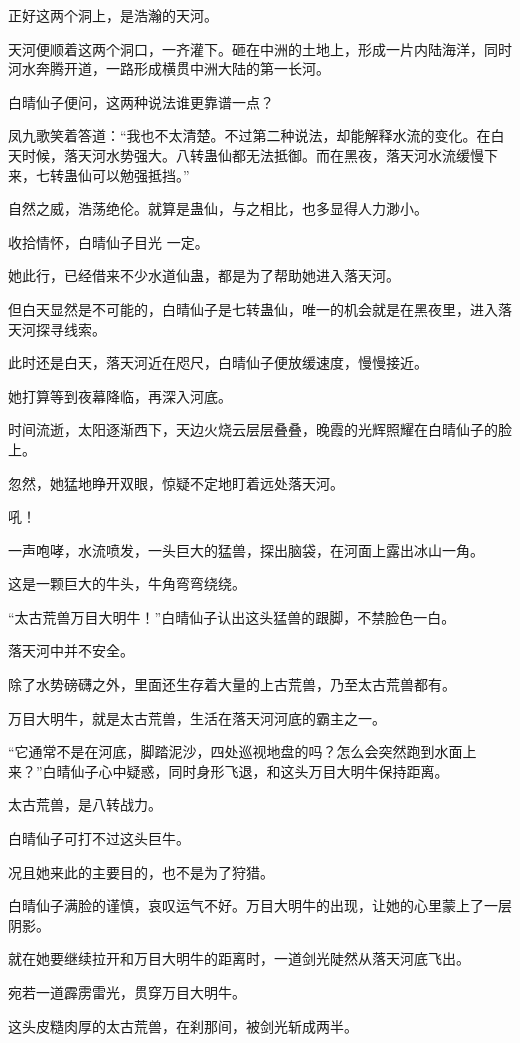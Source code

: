 \begin{this_body}
正好这两个洞上，是浩瀚的天河。

天河便顺着这两个洞口，一齐灌下。砸在中洲的土地上，形成一片内陆海洋，同时河水奔腾开道，一路形成横贯中洲大陆的第一长河。

白晴仙子便问，这两种说法谁更靠谱一点？

凤九歌笑着答道：“我也不太清楚。不过第二种说法，却能解释水流的变化。在白天时候，落天河水势强大。八转蛊仙都无法抵御。而在黑夜，落天河水流缓慢下来，七转蛊仙可以勉强抵挡。”

自然之威，浩荡绝伦。就算是蛊仙，与之相比，也多显得人力渺小。

收拾情怀，白晴仙子目光 一定。

她此行，已经借来不少水道仙蛊，都是为了帮助她进入落天河。

但白天显然是不可能的，白晴仙子是七转蛊仙，唯一的机会就是在黑夜里，进入落天河探寻线索。

此时还是白天，落天河近在咫尺，白晴仙子便放缓速度，慢慢接近。

她打算等到夜幕降临，再深入河底。

时间流逝，太阳逐渐西下，天边火烧云层层叠叠，晚霞的光辉照耀在白晴仙子的脸上。

忽然，她猛地睁开双眼，惊疑不定地盯着远处落天河。

吼！

一声咆哮，水流喷发，一头巨大的猛兽，探出脑袋，在河面上露出冰山一角。

这是一颗巨大的牛头，牛角弯弯绕绕。

“太古荒兽万目大明牛！”白晴仙子认出这头猛兽的跟脚，不禁脸色一白。

落天河中并不安全。

除了水势磅礴之外，里面还生存着大量的上古荒兽，乃至太古荒兽都有。

万目大明牛，就是太古荒兽，生活在落天河河底的霸主之一。

“它通常不是在河底，脚踏泥沙，四处巡视地盘的吗？怎么会突然跑到水面上来？”白晴仙子心中疑惑，同时身形飞退，和这头万目大明牛保持距离。

太古荒兽，是八转战力。

白晴仙子可打不过这头巨牛。

况且她来此的主要目的，也不是为了狩猎。

白晴仙子满脸的谨慎，哀叹运气不好。万目大明牛的出现，让她的心里蒙上了一层阴影。

就在她要继续拉开和万目大明牛的距离时，一道剑光陡然从落天河底飞出。

宛若一道霹雳雷光，贯穿万目大明牛。

这头皮糙肉厚的太古荒兽，在刹那间，被剑光斩成两半。


\end{this_body}
